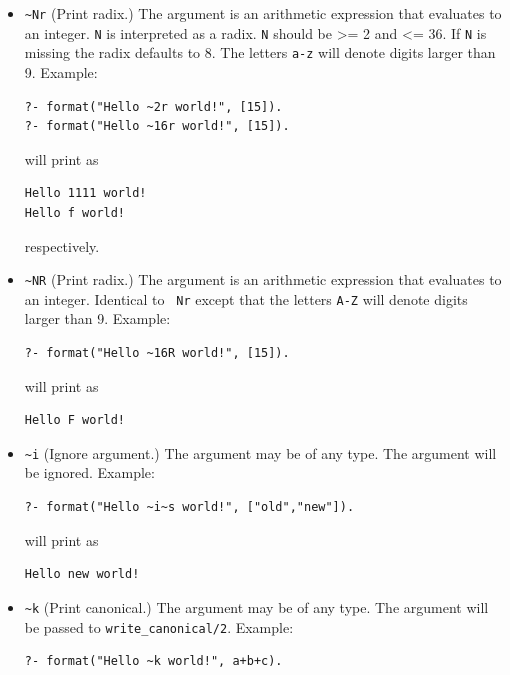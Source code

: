\begin{description}
\begin{itemize}
\item \verb|~Nr|
(Print radix.) The argument is an arithmetic expression that evaluates
to an integer. {\tt N} is interpreted as a radix.
{\tt N} should be >= 2 and <= 36.  If {\tt N} is missing the radix defaults to
8.  The letters {\tt a-z} will denote digits larger than 9.  Example:  

\begin{verbatim}
?- format("Hello ~2r world!", [15]).
?- format("Hello ~16r world!", [15]).
\end{verbatim}

\noindent
will print as

\begin{verbatim}
Hello 1111 world!
Hello f world!
\end{verbatim}

\noindent
respectively.

\item \verb|~NR|
(Print radix.) The argument is an arithmetic expression that evaluates
to an integer.  Identical to {\tt ~Nr} except
that the letters {\tt A-Z} will denote digits larger than 9.  Example:  

\begin{verbatim}
?- format("Hello ~16R world!", [15]).
\end{verbatim}

\noindent
will print as

\begin{verbatim}
Hello F world!
\end{verbatim}

\item \verb|~i|
(Ignore argument.) The argument may be of any type.  The argument will be
ignored.  Example:  

\begin{verbatim}
?- format("Hello ~i~s world!", ["old","new"]).
\end{verbatim}

\noindent
will print as

\begin{verbatim}
Hello new world!
\end{verbatim}

\item \verb|~k|
(Print canonical.) The argument may be of any type.  The argument will be
passed to {\tt write\_canonical/2}.  Example:  

\begin{verbatim}
?- format("Hello ~k world!", a+b+c).
\end{verbatim}


\end{itemize}
\end{description}
